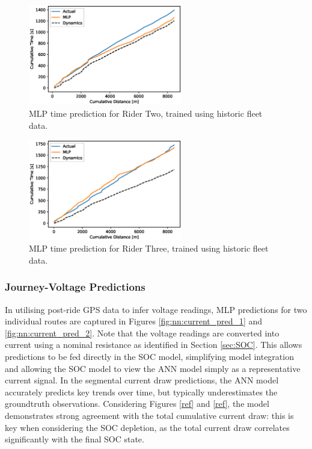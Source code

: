 \documentclass[a4paper, 10pt]{article}
\numberwithin{equation}{section}
\begin{document}
\begin{figure}[h!]
    \centering
    \includegraphics[width=0.6\textwidth]{images/NN_TestRide/RR_Cumulative_Time.eps}
    \caption{MLP time prediction for Rider Two, trained using historic fleet data.}
    \label{fig:nn:time_pred_r2}
\end{figure}

\begin{figure}[h!]
    \centering
    \includegraphics[width=0.6\textwidth]{images/NN_TestRide/OD_Cumulative_Time.eps}
    \caption{MLP time prediction for Rider Three, trained using historic fleet data.}
    \label{fig:nn:time_pred_r3}
\end{figure}

\subsubsection{Journey-Voltage Predictions}
In utilising post-ride GPS data to infer voltage readings, MLP predictions for two individual routes are captured in Figures \ref{fig:nn:current_pred_1} and \ref{fig:nn:current_pred_2}. Note that the voltage readings are converted into current using a nominal resistance as identified in Section \ref{sec:SOC}. This allows predictions to be fed directly in the SOC model, simplifying model integration and allowing the SOC model to view the ANN model simply as a representative current signal. In the segmental current draw predictions, the ANN model accurately predicts key trends over time, but typically underestimates the groundtruth observations. Considering Figures \ref{ref} and \ref{ref}, the model demonstrates strong agreement with the total cumulative current draw: this is key when considering the SOC depletion, as the total current draw correlates significantly with the final SOC state.
 
\end{document}
